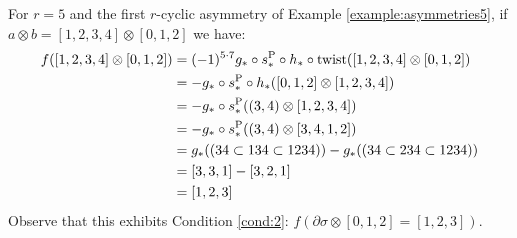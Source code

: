 \begin{example}\label{example:f5_2}
	For $r=5$ and the first $r$-cyclic asymmetry of Example \ref{example:asymmetries5}, if $a\otimes b = [1,2,3,4]\otimes [0,1,2]$ we have:
	\begin{align*}
		f([1,2,3,4]\otimes [0,1,2])
		&= (-1)^{5\cdot 7}g_*\circ s_*^{\operatorname{P}}\circ h_*\circ \operatorname{twist}([1,2,3,4]\otimes [0,1,2])
		\\
		&= -g_*\circ s_*^{\operatorname{P}}\circ h_*([0,1,2]\otimes [1,2,3,4])
		\\
		&= -g_*\circ s_*^{\operatorname{P}}((3,4)\otimes [1,2,3,4])
		\\
		&= -g_*\circ s_*^{\operatorname{P}}((3,4)\otimes [3,4,1,2])
		\\
		&= g_*((34\subset 134\subset 1234)) - g_*((34\subset 234\subset 1234))
		\\
		&= [3,3,1] - [3,2,1]
		\\
		&= [1,2,3]
	\end{align*}
	Observe that this exhibits Condition \eqref{cond:2}: $f(\partial\sigma \otimes [0,1,2] = [1,2,3])$.
\end{example}

